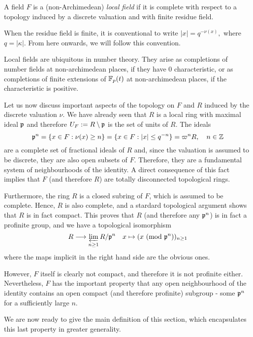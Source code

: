 \begin{defn}
    A field $F$ is a (non-Archimedean) \textit{local field} if it is complete with respect to a topology induced by a discrete valuation and with finite residue field.
\end{defn}

\begin{rem}
    When the residue field is finite, it is conventional to write 
    $|x|=q^{-\nu(x)},$
    where $q=|\kappa|$. From here onwards, we will follow this convention.
\end{rem}
\begin{rem}
    Local fields are ubiquitous in number theory. They arise as completions of number fields at non-archimedean places, if they have $0$ characteristic, or as completions of finite extensions of $\mathbb{F}_p(t)$ at non-archimedean places, if the characteristic is positive.
\end{rem}

Let us now discuss important aspects of the topology on $F$ and $R$ induced by the discrete valuation $\nu$. We have already seen that $R$ is a local ring with maximal ideal $\mathfrak{p}$ and therefore $U_F:=R\setminus\mathfrak{p}$ is the set of units of $R$. The ideals 
$$\mathfrak{p}^n=\{x\in F:\nu(x)\geq n\}=\{x\in F: |x|\leq q^{-n}\}=\varpi^n R,\quad n\in\mathbb{Z}$$
are a complete set of fractional ideals of $R$ and, since the valuation is assumed to be discrete, they are also open subsets of $F$.
Therefore, they are a fundamental system of neighbourhoods of the identity. A direct consequence of this fact implies that $F$ (and therefore $R$) are totally disconnected topological rings.

Furthermore, the ring $R$ is a closed subring of $F$, which is assumed to be complete. Hence, $R$ is also complete, and a stardard topological argument shows that $R$ is in fact compact. This proves that $R$ (and therefore any $\mathfrak{p}^n$) is in fact a profinite group, and we have a topological isomorphism 
$$R\longrightarrow\varprojlim_{n\geq 1} R/\mathfrak{p}^n\quad x\mapsto (x\ (\textrm{mod }{\mathfrak{p}^n}))_{n\geq 1}$$
where the maps implicit in the right hand side are the obvious ones.

However, $F$ itself is clearly not compact, and therefore it is not profinite either. Nevertheless, $F$ has the important property that any open neighbourhood of the identity contains an open compact (and therefore profinite) subgroup - some $\mathfrak{p}^n$ for a sufficiently large $n$.

We are now ready to give the main definition of this section, which encapsulates this last property in greater generality.

